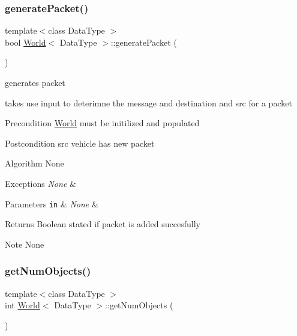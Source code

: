 \subsubsection{\texorpdfstring{generate\+Packet()}{generatePacket()}}
{\footnotesize\ttfamily template$<$class Data\+Type $>$ \\
bool \hyperlink{class_world}{World}$<$ Data\+Type $>$\+::generate\+Packet (\begin{DoxyParamCaption}{ }\end{DoxyParamCaption})}



generates packet 

takes use input to deterimne the message and destination and src for a packet

\begin{DoxyPrecond}{Precondition}
\hyperlink{class_world}{World} must be initilized and populated
\end{DoxyPrecond}
\begin{DoxyPostcond}{Postcondition}
src vehicle has new packet
\end{DoxyPostcond}
\begin{DoxyParagraph}{Algorithm None}

\end{DoxyParagraph}

\begin{DoxyExceptions}{Exceptions}
{\em None} & \\
\hline
\end{DoxyExceptions}

\begin{DoxyParams}[1]{Parameters}
\mbox{\tt in}  & {\em None} & \\
\hline
\end{DoxyParams}
\begin{DoxyReturn}{Returns}
Boolean stated if packet is added succesfully
\end{DoxyReturn}
\begin{DoxyNote}{Note}
None 
\end{DoxyNote}
\hypertarget{class_world_afa6ac3d6800045c803a6b0072a5ab3fb}{}\label{class_world_afa6ac3d6800045c803a6b0072a5ab3fb} 
\subsubsection{\texorpdfstring{get\+Num\+Objects()}{getNumObjects()}}
{\footnotesize\ttfamily template$<$class Data\+Type $>$ \\
int \hyperlink{class_world}{World}$<$ Data\+Type $>$\+::get\+Num\+Objects (\begin{DoxyParamCaption}{ }\end{DoxyParamCaption})}



